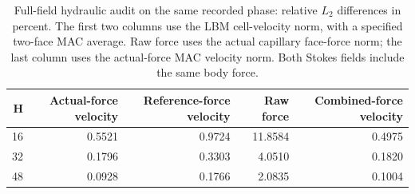 \begin{table}[htbp]\centering\small
\caption{Full-field hydraulic audit on the same recorded phase: relative $L_2$ differences in percent. The first two columns use the LBM cell-velocity norm, with a specified two-face MAC average. Raw force uses the actual capillary face-force norm; the last column uses the actual-force MAC velocity norm. Both Stokes fields include the same body force.}\label{tab:majorfields}
\begin{tabular}{rrrrr}\toprule
H & Actual-force velocity & Reference-force velocity & Raw force & Combined-force velocity\\\midrule
16 & 0.5521 & 0.9724 & 11.8584 & 0.4975\\
32 & 0.1796 & 0.3303 & 4.0510 & 0.1820\\
48 & 0.0928 & 0.1766 & 2.0835 & 0.1004\\
\bottomrule\end{tabular}\end{table}
